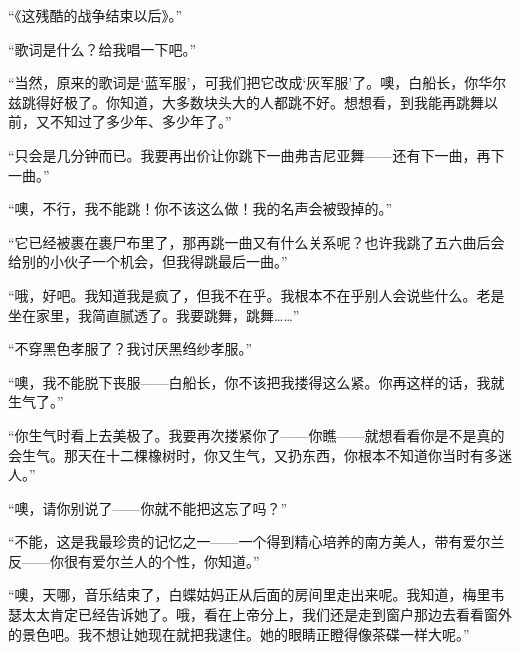 \par “《这残酷的战争结束以后》。”
\par “歌词是什么？给我唱一下吧。”
\par “当然，原来的歌词是‘蓝军服’，可我们把它改成‘灰军服’了。噢，白船长，你华尔兹跳得好极了。你知道，大多数块头大的人都跳不好。想想看，到我能再跳舞以前，又不知过了多少年、多少年了。”
\par “只会是几分钟而已。我要再出价让你跳下一曲弗吉尼亚舞——还有下一曲，再下一曲。”
\par “噢，不行，我不能跳！你不该这么做！我的名声会被毁掉的。”
\par “它已经被裹在裹尸布里了，那再跳一曲又有什么关系呢？也许我跳了五六曲后会给别的小伙子一个机会，但我得跳最后一曲。”
\par “哦，好吧。我知道我是疯了，但我不在乎。我根本不在乎别人会说些什么。老是坐在家里，我简直腻透了。我要跳舞，跳舞……”
\par “不穿黑色孝服了？我讨厌黑绉纱孝服。”
\par “噢，我不能脱下丧服——白船长，你不该把我搂得这么紧。你再这样的话，我就生气了。”
\par “你生气时看上去美极了。我要再次搂紧你了——你瞧——就想看看你是不是真的会生气。那天在十二棵橡树时，你又生气，又扔东西，你根本不知道你当时有多迷人。”
\par “噢，请你别说了——你就不能把这忘了吗？”
\par “不能，这是我最珍贵的记忆之一——一个得到精心培养的南方美人，带有爱尔兰反——你很有爱尔兰人的个性，你知道。”
\par “噢，天哪，音乐结束了，白蝶姑妈正从后面的房间里走出来呢。我知道，梅里韦瑟太太肯定已经告诉她了。哦，看在上帝分上，我们还是走到窗户那边去看看窗外的景色吧。我不想让她现在就把我逮住。她的眼睛正瞪得像茶碟一样大呢。”

